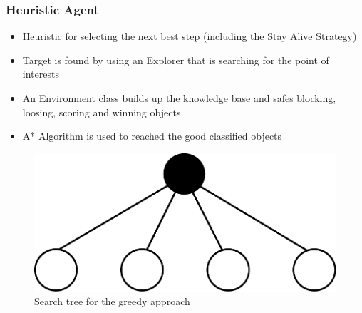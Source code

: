 \documentclass{beamer}
\begin{document}
\begin{frame}
\end{frame}



\begin{frame}
\frametitle{Heuristic Agent}
\begin{itemize}
\item Heuristic for selecting the next best step (including the Stay Alive Strategy)
\item Target is found by using an Explorer that is searching for
the point of interests

\item An Environment class builds up the knowledge base and safes
blocking, loosing, scoring and winning objects

\item A* Algorithm is used to reached the good classified objects

\end{itemize}

\begin{figure}
\centering
\includegraphics[scale=0.3]{../report/images/onestep_lookahead.pdf}
\caption{Search tree for the greedy approach}
\label{fig:onestep}
\end{figure}

\end{frame}
\end{document}
